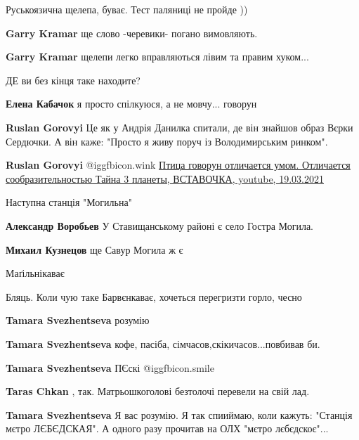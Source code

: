 \begin{itemize}
Руськоязична щелепа, буває. Тест паляниці не пройде ))

\begin{itemize} %
\textbf{Garry Kramar} ще слово -черевики- погано вимовляють.

\textbf{Garry Kramar} щелепи легко вправляються лівим та правим хуком...
\end{itemize} %

ДЕ ви без кінця таке находите?

\begin{itemize} %
\textbf{Елена Кабачок} я просто спілкуюся, а не мовчу... говорун

\textbf{Ruslan Gorovyi} Це як у Андрія Данилка спитали, де він знайшов образ Вєрки Сердючки. А він каже: "Просто я живу поруч із Володимирським ринком".

\textbf{Ruslan Gorovyi}  @igg{fbicon.wink} 
\href{https://youtu.be/A_elSrJbi1M}{%
Птица говорун отличается умом. Отличается сообразительностью Тайна 3 планеты, ВСТАВОЧКА, youtube, 19.03.2021%
}

\end{itemize} %

Наступна станція "Могильна"

\begin{itemize} %
\textbf{Александр Воробьев} У Ставищанському районі є село Гостра Могила.

\textbf{Михаил Кузнецов} ще Савур Могила ж є
\end{itemize} %

Маґільнікаває

Бляць. Коли чую таке Барвєнкаває, хочеться перегризти горло, чесно

\begin{itemize} %
\textbf{Tamara Svezhentseva} розумію

\textbf{Tamara Svezhentseva} кофе, пасіба, сімчасов,скікичасов...повбивав би.

\textbf{Tamara Svezhentseva} ПЄскі  @igg{fbicon.smile} 

\textbf{Taras Chkan} , так. Матрьошкоголові безтолочі перевели на свій лад.

\textbf{Tamara Svezhentseva} Я вас розумію. Я так спииймаю, коли кажуть: "Станція мєтро ЛЄБЄДСКАЯ".
А одного разу прочитав на ОЛХ "мєтро лєбєдскоє"...


\end{itemize}
\end{itemize}
